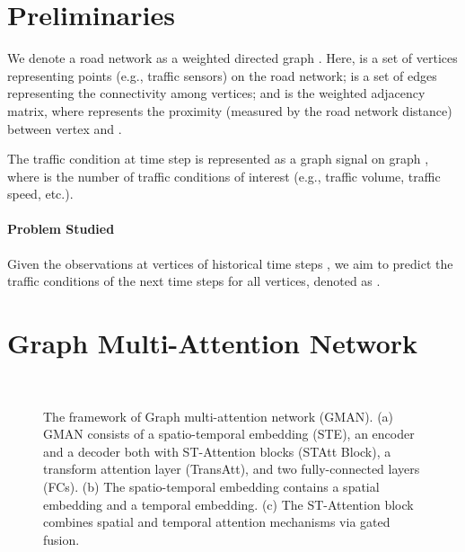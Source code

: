\documentclass[letterpaper]{article} \usepackage{aaai20}  \usepackage{times}  \usepackage{helvet} \usepackage{courier}  \usepackage[hyphens]{url}  \usepackage{graphicx} \usepackage{amsmath}
\begin{document}
\section{Preliminaries}

We denote a road network as a weighted directed graph . Here,  is a set of  vertices representing points (e.g., traffic sensors) on the road network;  is a set of edges representing the connectivity among vertices; and  is the weighted adjacency matrix, where  represents the proximity (measured by the road network distance) between vertex  and . 

The traffic condition at time step  is represented as a graph signal  on graph , where  is the number of traffic conditions of interest (e.g., traffic volume, traffic speed, etc.). 

\paragraph{Problem Studied} Given the observations at  vertices of historical  time steps , we aim to predict the traffic conditions of the next  time steps for all vertices, denoted as . 

\section{Graph Multi-Attention Network}

\begin{figure}
	\centering
	\begin{minipage}{0.514 \columnwidth}
	\end{minipage}	
	\begin{minipage}{0.476 \columnwidth}
		\\
	\end{minipage}
	\caption{The framework of Graph multi-attention network (GMAN). (a) GMAN consists of a spatio-temporal embedding (STE), an encoder and a decoder both with  ST-Attention blocks (STAtt Block), a transform attention layer (TransAtt), and two fully-connected layers (FCs). (b) The spatio-temporal embedding contains a spatial embedding and a temporal embedding. (c) The ST-Attention block combines spatial and temporal attention mechanisms via gated fusion.}
	\label{Figure2}
\end{figure}
\end{document}
